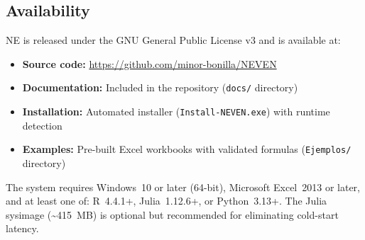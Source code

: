 \documentclass[preprint,12pt,authoryear]{elsarticle}
\newcommand{\neven}{NE\raisebox{0.2ex}{v}\rotatebox[origin=c]{180}{E}\rotatebox[origin=c]{180}{N}}
\begin{document}
\subsection{Availability}

\neven{} is released under the GNU General Public License v3 and is available at:
\begin{itemize}
    \item \textbf{Source code:} \url{https://github.com/minor-bonilla/NEVEN}
    \item \textbf{Documentation:} Included in the repository (\texttt{docs/} directory)
    \item \textbf{Installation:} Automated installer (\texttt{Install-NEVEN.exe}) with runtime detection
    \item \textbf{Examples:} Pre-built Excel workbooks with validated formulas (\texttt{Ejemplos/} directory)
\end{itemize}

The system requires Windows~10 or later (64-bit), Microsoft Excel~2013 or later, and at least one of: R~4.4.1+, Julia~1.12.6+, or Python~3.13+. The Julia sysimage (\textasciitilde415~MB) is optional but recommended for eliminating cold-start latency.



\end{document}
